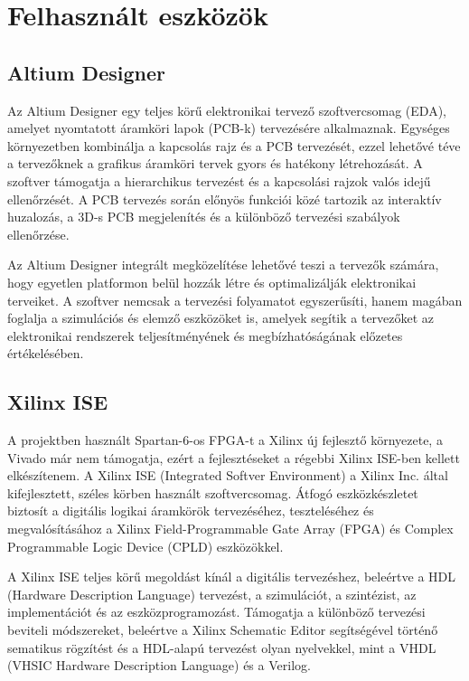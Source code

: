 \chapter{Felhasznált eszközök}

\section{Altium Designer}

Az Altium Designer egy teljes körű elektronikai tervező szoftvercsomag (EDA), amelyet nyomtatott áramköri lapok (PCB-k) tervezésére alkalmaznak. Egységes környezetben kombinálja a kapcsolás rajz és a PCB tervezését, ezzel lehetővé téve a tervezőknek a grafikus áramköri tervek gyors és hatékony létrehozását. A szoftver támogatja a hierarchikus tervezést és a kapcsolási rajzok valós idejű ellenőrzését. A PCB tervezés során előnyös funkciói közé tartozik az interaktív huzalozás, a 3D-s PCB megjelenítés és a különböző tervezési szabályok ellenőrzése.

Az Altium Designer integrált megközelítése lehetővé teszi a tervezők számára, hogy egyetlen platformon belül hozzák létre és optimalizálják elektronikai terveiket. A szoftver nemcsak a tervezési folyamatot egyszerűsíti, hanem magában foglalja a szimulációs és elemző eszközöket is, amelyek segítik a tervezőket az elektronikai rendszerek teljesítményének és megbízhatóságának előzetes értékelésében.

\section{Xilinx ISE}

A projektben használt Spartan-6-os FPGA-t a Xilinx új fejlesztő környezete, a Vivado már nem támogatja, ezért a fejlesztéseket a régebbi Xilinx ISE-ben kellett elkészítenem. A Xilinx ISE (Integrated Softver Environment) a Xilinx Inc. által kifejlesztett, széles körben használt szoftvercsomag. Átfogó eszközkészletet biztosít a digitális logikai áramkörök tervezéséhez, teszteléséhez és megvalósításához a Xilinx Field-Programmable Gate Array (FPGA) és Complex Programmable Logic Device (CPLD) eszközökkel.

A Xilinx ISE teljes körű megoldást kínál a digitális tervezéshez, beleértve a HDL (Hardware Description Language) tervezést, a szimulációt, a szintézist, az implementációt és az eszközprogramozást. Támogatja a különböző tervezési beviteli módszereket, beleértve a Xilinx Schematic Editor segítségével történő sematikus rögzítést és a HDL-alapú tervezést olyan nyelvekkel, mint a VHDL (VHSIC Hardware Description Language) és a Verilog.

